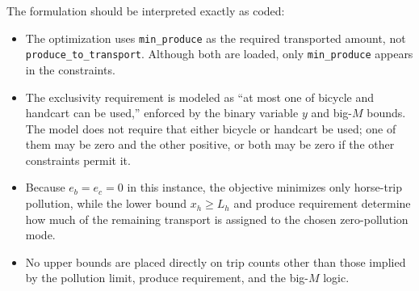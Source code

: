 The formulation should be interpreted exactly as coded:

\begin{itemize}
    \item The optimization uses \texttt{min\_produce} as the required transported amount, not \texttt{produce\_to\_transport}. Although both are loaded, only \texttt{min\_produce} appears in the constraints.
    \item The exclusivity requirement is modeled as ``at most one of bicycle and handcart can be used,'' enforced by the binary variable \(y\) and big-\(M\) bounds. The model does not require that either bicycle or handcart be used; one of them may be zero and the other positive, or both may be zero if the other constraints permit it.
    \item Because \(e_b=e_c=0\) in this instance, the objective minimizes only horse-trip pollution, while the lower bound \(x_h \ge L_h\) and produce requirement determine how much of the remaining transport is assigned to the chosen zero-pollution mode.
    \item No upper bounds are placed directly on trip counts other than those implied by the pollution limit, produce requirement, and the big-\(M\) logic.
\end{itemize}
